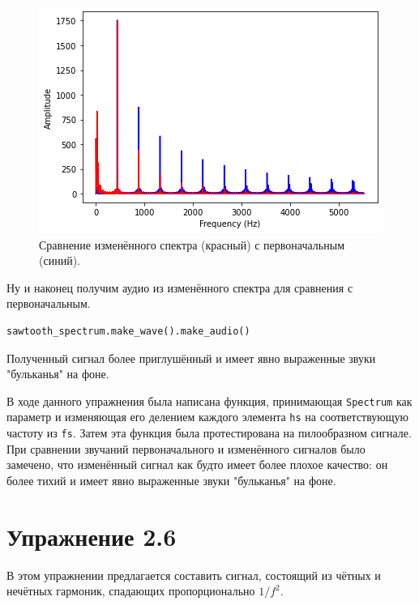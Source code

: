 \documentclass[a4paper, 14pt]{extarticle}
\begin{document}
    \begin{figure}[H]
        \centering
        \includegraphics[width=0.8\linewidth]{resources/Images/task5_compare_spectrum}
        \caption{Сравнение изменённого спектра (красный) с первоначальным (синий).}
        \label{fig:task5_compare_spectrum}
    \end{figure}

    Ну и наконец получим аудио из изменённого спектра для сравнения с первоначальным.

    \begin{lstlisting}[language=Python, caption= Получение аудио., label={lst:task5_new_wave_audio}]
sawtooth_spectrum.make_wave().make_audio()
    \end{lstlisting}

    Полученный сигнал более приглушённый и имеет явно выраженные звуки "бульканья" на фоне.

    В ходе данного упражнения была написана функция, принимающая \texttt{Spectrum} как параметр и изменяющая его
    делением каждого элемента \texttt{hs} на соответствующую частоту из \texttt{fs}.
    Затем эта функция была протестирована на пилообразном сигнале.
    При сравнении звучаний первоначального и изменённого сигналов было замечено, что изменённый сигнал как будто имеет
    более плохое качество: он более тихий и имеет явно выраженные звуки "бульканья" на фоне.

    \newpage

    \section{Упражнение 2.6}
    \label{sec:task6}

    В этом упражнении предлагается составить сигнал, состоящий из чётных и нечётных гармоник, спадающих пропорционально $1/f^2$.
\end{document}

